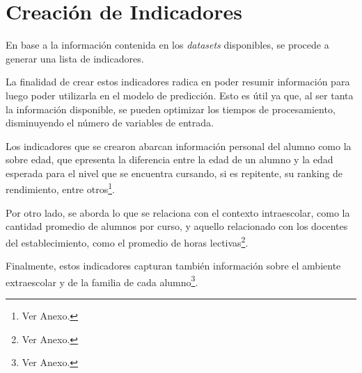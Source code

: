 \section{Creación de Indicadores}
En base a la información contenida en los \textit{datasets} disponibles, se procede a generar una lista de indicadores. 

La finalidad de crear estos indicadores radica en poder resumir información para luego poder utilizarla en el modelo de predicción. Esto es útil ya que, al ser tanta la información disponible, se pueden optimizar los tiempos de procesamiento, disminuyendo el número de variables de entrada. 

Los indicadores que se crearon abarcan información personal del alumno como la sobre edad, que epresenta la diferencia entre la edad de un alumno y la edad esperada para el nivel que se encuentra cursando, si es repitente, su ranking de rendimiento, entre otros\footnote{Ver Anexo.}. 

Por otro lado, se aborda lo que se relaciona con el contexto intraescolar, como la cantidad promedio de alumnos por curso, y aquello relacionado con los docentes del establecimiento, como el promedio de horas lectivas\footnote{Ver Anexo.}.

Finalmente, estos indicadores capturan también información sobre el ambiente extraescolar y de la familia de cada alumno\footnote{Ver Anexo.}. 
